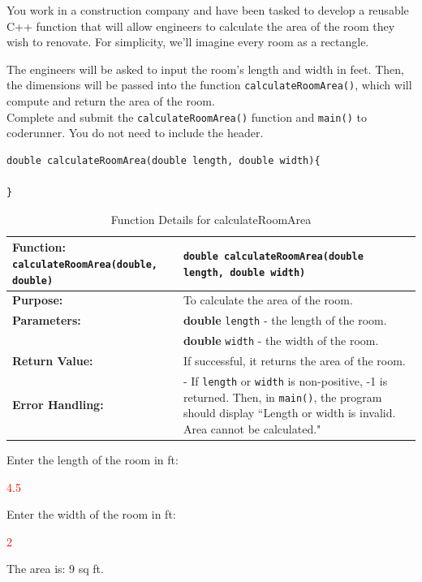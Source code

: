 You work in a construction company and have been tasked to develop a reusable C++ function that will allow engineers to calculate the area of the room they wish to renovate. For simplicity, we'll imagine every room as a rectangle.

The engineers will be asked to input the room's length and width in feet. Then, the dimensions will be passed into the function \texttt{calculateRoomArea()}, which will compute and return the area of the room. \\

Complete and submit the \texttt{calculateRoomArea()} function and \texttt{main()} to coderunner. You do not need to include the header. 

\begin{verbatim}
double calculateRoomArea(double length, double width){

}
\end{verbatim}

\begin{table}[h!]
\centering
\begin{tabular}{|p{1.7in}|p{4.3in}|}
\hline
\textbf{Function:}  \texttt{calculateRoomArea(double, double)} 
& \texttt{double calculateRoomArea(double length, double width)} \\ \hline

\textbf{Purpose:} & To calculate the area of the room. \\ \hline

\textbf{Parameters:} & 
\textbf{double} \texttt{length} - the length of the room. \\
 & \textbf{double} \texttt{width} - the width of the room. \\ \hline

\textbf{Return Value:} & 
If successful, it returns the area of the room. \\ \hline

\textbf{Error Handling:} & 
- If \texttt{length} or \texttt{width} is non-positive, -1 is returned. Then, in \texttt{main()}, the program should display ``Length or width is invalid. Area cannot be calculated."\\ \hline


\end{tabular}
\caption{Function Details for calculateRoomArea}
\end{table}

\begin{sample}
Enter the length of the room in ft:

 \textcolor{red}{4.5}
 
Enter the width of the room in ft:

 \textcolor{red}{2}
 
The area is: 9 sq ft.

\end{sample}

